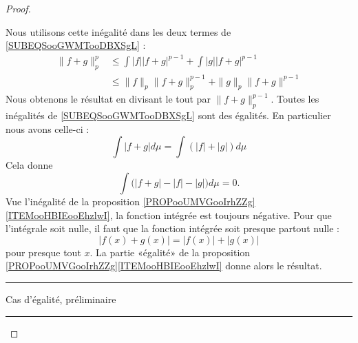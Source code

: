 \begin{proof}
\begin{subproof}
		Nous utilisons cette inégalité dans les deux termes de \eqref{SUBEQSooGWMTooDBXSgL} :
		\begin{subequations}		\label{SUBEQSooKHKOooOCfndf}
			\begin{align}
				\| f+g \|_p^p & \leq \int | f || f+g |^{p-1}+\int | g || f+g |^{p-1}     \\
				              & \leq \| f \|_p\| f+g \|_p^{p-1}+\| g \|_p\| f+g \|^{p-1}
			\end{align}
		\end{subequations}
		Nous obtenons le résultat en divisant le tout par \( \| f+g \|_p^{p-1}\).
		Toutes les inégalités de \eqref{SUBEQSooGWMTooDBXSgL} sont des égalités. En particulier nous avons celle-ci :
		\begin{equation}
			\int | f+g |d\mu=\int(| f |+| g |)d\mu
		\end{equation}
		Cela donne
		\begin{equation}
			\int\big( | f+g |-| f |-|g| \big)d\mu=0.
		\end{equation}
		Vue l'inégalité de la proposition \ref{PROPooUMVGooIrhZZg}\ref{ITEMooHBIEooEhzlwI}, la fonction intégrée est toujours négative. Pour que l'intégrale soit nulle, il faut que la fonction intégrée soit presque partout nulle :
		\begin{equation}
			| f(x)+g(x) |=| f(x) |+| g(x) |
		\end{equation}
		pour presque tout \( x\). La partie «égalité» de la proposition \ref{PROPooUMVGooIrhZZg}\ref{ITEMooHBIEooEhzlwI} donne alors le résultat.
	\end{subproof}

	\begin{center}
		\noindent\rule{2cm}{0.4pt}
		Cas d'égalité, préliminaire
		\noindent\rule{2cm}{0.4pt}
	\end{center}


\end{proof}
